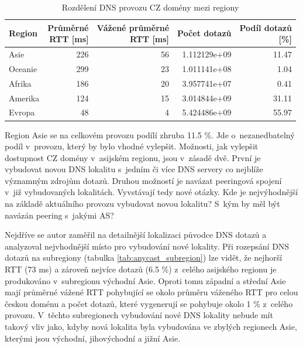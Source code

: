 \documentclass[thesis=M,czech]{src/FITthesis}[2019/12/23]
\begin{document}
\begin{table}
\centering
\begin{tabular}{lrrrr}
\toprule
{Region} & \makecell{Průměrné\\RTT [ms]} &  \makecell{Vážené průměrné\\RTT [ms]} &  Počet dotazů &  \makecell{Podíl dotazů\\\ [\%]} \\
\midrule
Asie     & 226 & 56 &  1.112129e+09 & 11.47 \\
Oceanie  & 299 & 23 &  1.011141e+08 &  1.04 \\
Afrika   & 186 & 20 &  3.957741e+07 &  0.41 \\
Amerika & 124 & 15 &  3.014844e+09 & 31.11 \\
Evropa   &  48 &  4 &  5.424486e+09 & 55.97 \\
\bottomrule
\end{tabular}
 	\caption[]{Rozdělení DNS provozu CZ domény mezi regiony} 
 	\label{tab:anycast_region}
\end{table}

Region Asie se na celkovém provozu podílí zhruba 11.5 \%. Jde o~nezanedbatelný podíl v~provozu, který by bylo vhodné vylepšit. Možnosti, jak vylepšit dostupnost CZ domény v~asijském regionu, jsou v~zásadě dvě. První je vybudovat novou DNS lokalitu s~jedním či více DNS servery co nejblíže významným zdrojům dotazů. Druhou možností je navázat peeringová spojení v~již vybudovaných lokalitách. Vyvstávají tedy nové otázky. Kde je nejvýhodnější na základě aktuálního provozu vybudovat novou lokalitu? S~kým by měl být navázán peering s~jakými AS? 

Nejdříve se autor zaměřil na detailnější lokalizaci původce DNS dotazů a analyzoval nejvhodnější místo pro vybudování nové lokality. Při rozepsání DNS dotazů na subregiony (tabulka \ref{tab:anycast_subregion}) lze vidět, že nejhorší RTT (73 ms) a zároveň nejvíce dotazů (6.5 \%) z~celého asijského regionu je produkováno v~subregionu východní Asie. Oproti tomu západní a střední Asie mají průměrné vážené RTT pohybující se okolo průměru váženého RTT pro celou českou doménu a počet dotazů, které vygenerují se pohybuje okolo 1 \% z~celého provozu. V~těchto subregionech vybudování nové DNS lokality nebude mít takový vliv jako, kdyby nová lokalita byla  vybudována ve zbylých regionech Asie, kterými jsou východní, jihovýchodní a jižní Asie.  
\end{document}
